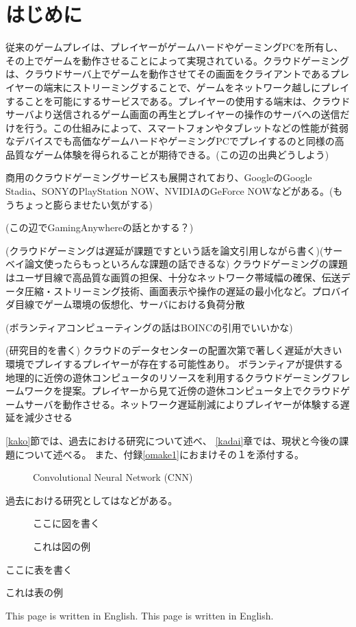 \section{はじめに}

 従来のゲームプレイは、プレイヤーがゲームハードやゲーミングPCを所有し、その上でゲームを動作させることによって実現されている。クラウドゲーミングは、クラウドサーバ上でゲームを動作させてその画面をクライアントであるプレイヤーの端末にストリーミングすることで、ゲームをネットワーク越しにプレイすることを可能にするサービスである。プレイヤーの使用する端末は、クラウドサーバより送信されるゲーム画面の再生とプレイヤーの操作のサーバへの送信だけを行う。この仕組みによって、スマートフォンやタブレットなどの性能が貧弱なデバイスでも高価なゲームハードやゲーミングPCでプレイするのと同様の高品質なゲーム体験を得られることが期待できる。(この辺の出典どうしよう)

 商用のクラウドゲーミングサービスも展開されており、GoogleのGoogle Stadia、SONYのPlayStation NOW、NVIDIAのGeForce NOWなどがある。(もうちょっと膨らませたい気がする)

(この辺でGamingAnywhereの話とかする？)

(クラウドゲーミングは遅延が課題ですという話を論文引用しながら書く)(サーベイ論文使ったらもっといろんな課題の話できるな)
クラウドゲーミングの課題はユーザ目線で高品質な画質の担保、十分なネットワーク帯域幅の確保、伝送データ圧縮・ストリーミング技術、画面表示や操作の遅延の最小化など。プロバイダ目線でゲーム環境の仮想化、サーバにおける負荷分散

(ボランティアコンピューティングの話はBOINCの引用でいいかな)

(研究目的を書く)
クラウドのデータセンターの配置次第で著しく遅延が大きい環境でプレイするプレイヤーが存在する可能性あり。
ボランティアが提供する地理的に近傍の遊休コンピュータのリソースを利用するクラウドゲーミングフレームワークを提案。プレイヤーから見て近傍の遊休コンピュータ上でクラウドゲームサーバを動作させる。ネットワーク遅延削減によりプレイヤーが体験する遅延を減少させる

\ref{kako}節では、過去における研究について述べ、
\ref{kadai}章では、現状と今後の課題について述べる。
また、付録\ref{omake1}におまけその１を添付する。

\begin{figure*}[t]
 \centering
 \caption{Convolutional Neural Network (CNN)}
 \label{fig:CNN}
\end{figure*}

過去における研究としては\cite{alex_nips12}などがある。

\begin{figure}
\centerline{ここに図を書く}
\caption{これは図の例}
\end{figure}

\begin{table}
\centerline{ここに表を書く}
\caption{これは表の例}
\end{table}


\newpage

This page is written in English. This page is written in English. 
